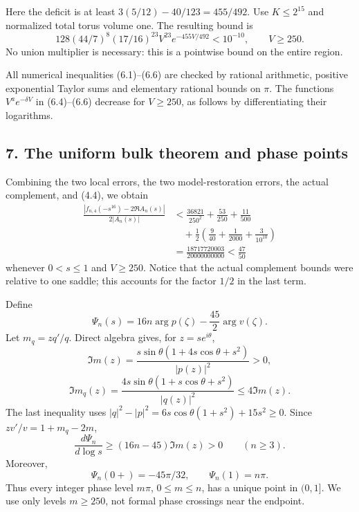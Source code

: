 \documentclass[
  11pt,
]{article}
\begin{document}
Here the deficit is at least \(3(5/12)-40/123=455/492\). Use
\(K\le2^{15}\) and normalized total torus volume one. The resulting
bound is \[
 128(44/7)^8(17/16)^{23}V^{23}e^{-455V/492}<10^{-10},
 \qquad V\ge250.                                             \tag{6.6}
\] No union multiplier is necessary: this is a pointwise bound on the
entire region.

All numerical inequalities (6.1)--(6.6) are checked by rational
arithmetic, positive exponential Taylor sums and elementary rational
bounds on \(\pi\). The functions \(V^a e^{-\delta V}\) in (6.4)--(6.6)
decrease for \(V\ge250\), as follows by differentiating their
logarithms.

\subsection{7. The uniform bulk theorem and phase
points}\label{the-uniform-bulk-theorem-and-phase-points}

Combining the two local errors, the two model-restoration errors, the
actual complement, and (4.4), we obtain \[
\begin{aligned}
\frac{|f_{n,4}(-s^{16})-2\Re A_n(s)|}{2|A_n(s)|}
 &<\frac{36821}{250^2}+\frac{53}{250}+\frac{11}{500}
 \\ &\quad+\frac12\left(\frac9{40}+\frac1{2000}+\frac3{10^{10}}\right)
 \\ &=\frac{18717720003}{20000000000}<\frac{47}{50}                 
\end{aligned}\tag{7.1}
\] whenever \(0<s\le1\) and \(V\ge250\). Notice that the actual
complement bounds were relative to one saddle; this accounts for the
factor \(1/2\) in the last term.

Define \[
 \Psi_n(s)=16n\arg p(\zeta)-\frac{45}{2}\arg v(\zeta).
\] Let \(m_q=zq'/q\). Direct algebra gives, for \(z=se^{i\theta}\), \[
 \Im m(z)=\frac{s\sin\theta(1+4s\cos\theta+s^2)}{|p(z)|^2}>0,
\] \[
 \Im m_q(z)=\frac{4s\sin\theta(1+s\cos\theta+s^2)}{|q(z)|^2}
             \le4\Im m(z).
\] The last inequality uses
\(|q|^2-|p|^2=6s\cos\theta(1+s^2)+15s^2\ge0\). Since \(zv'/v=1+m_q-2m\),
\[
 \frac{d\Psi_n}{d\log s}\ge(16n-45)\Im m(z)>0\qquad(n\ge3).  \tag{7.2}
\] Moreover, \[
 \Psi_n(0+)=-45\pi/32,\qquad \Psi_n(1)=n\pi.
\] Thus every integer phase level \(m\pi\), \(0\le m\le n\), has a
unique point in \((0,1]\). We use only levels \(m\ge250\), not formal
phase crossings near the endpoint.
\end{document}
